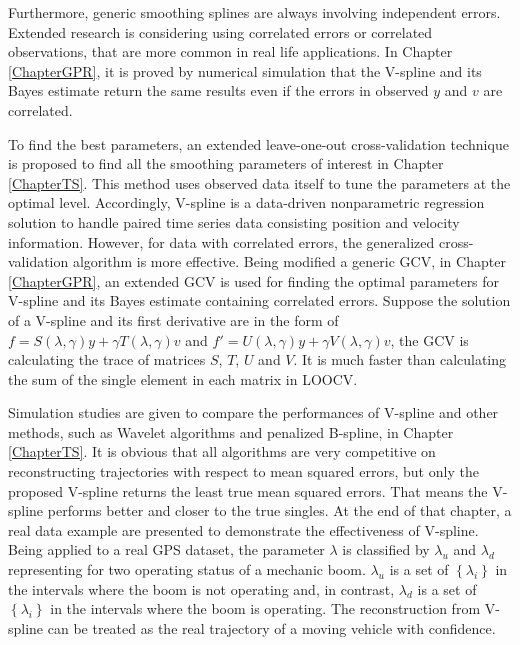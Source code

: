Furthermore, generic smoothing splines are always involving independent errors. Extended research is considering using correlated errors or correlated observations, that are more common in real life applications. In Chapter \ref{ChapterGPR}, it is proved by numerical simulation that the V-spline and its Bayes estimate return the same results even if the errors in observed $y$ and $v$ are correlated.  

To find the best parameters, an extended leave-one-out cross-validation technique is proposed to find all the smoothing parameters of interest in Chapter \ref{ChapterTS}. This method uses  observed data itself to tune the parameters at the optimal level. Accordingly, V-spline is a data-driven nonparametric regression solution to handle paired time series data consisting position and velocity information. However, for data with correlated errors, the generalized cross-validation algorithm is more effective. Being modified a generic GCV, in Chapter \ref{ChapterGPR}, an extended GCV is used for finding the optimal parameters for V-spline and its Bayes estimate containing correlated errors. Suppose the solution of a V-spline and its first derivative are in the form of $f=S(\lambda,\gamma)y+\gamma T(\lambda,\gamma)v$ and $f'=U(\lambda,\gamma)y+\gamma V(\lambda,\gamma)v$, the GCV is calculating the trace of matrices $S$, $T$, $U$ and $V$. It is much faster than calculating the sum of the single element in each matrix in LOOCV. 

Simulation studies are given to compare the performances of V-spline and other methods, such as Wavelet algorithms and penalized B-spline, in Chapter \ref{ChapterTS}. It is obvious that all algorithms are very competitive on reconstructing trajectories with respect to mean squared errors, but only the proposed V-spline returns the least true mean squared errors. That means the V-spline performs better and closer to the true singles. At the end of that chapter, a real data example are presented to demonstrate the effectiveness of V-spline. Being applied to a real GPS dataset, the parameter $\lambda$ is classified by $\lambda_u$ and $\lambda_d$ representing for two operating status of a mechanic boom. $\lambda_u$ is a set of $\left\lbrace\lambda_i\right\rbrace$ in the intervals where the boom is not operating and, in contrast, $\lambda_d$ is a set of $\left\lbrace\lambda_i\right\rbrace$ in the intervals where the boom is operating. The reconstruction from V-spline can be treated as the real trajectory of a moving vehicle with confidence. 

